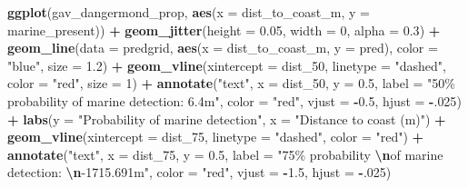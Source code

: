 \documentclass[
]{article}
\newenvironment{Shaded}{\begin{snugshade}}{\end{snugshade}}
\newcommand{\AttributeTok}[1]{\textcolor[rgb]{0.13,0.29,0.53}{#1}}
\newcommand{\DecValTok}[1]{\textcolor[rgb]{0.00,0.00,0.81}{#1}}
\newcommand{\FloatTok}[1]{\textcolor[rgb]{0.00,0.00,0.81}{#1}}
\newcommand{\FunctionTok}[1]{\textcolor[rgb]{0.13,0.29,0.53}{\textbf{#1}}}
\newcommand{\NormalTok}[1]{#1}
\newcommand{\SpecialCharTok}[1]{\textcolor[rgb]{0.81,0.36,0.00}{\textbf{#1}}}
\newcommand{\StringTok}[1]{\textcolor[rgb]{0.31,0.60,0.02}{#1}}
\begin{document}
\begin{Shaded}
\begin{Highlighting}[]
\FunctionTok{ggplot}\NormalTok{(gav\_dangermond\_prop, }\FunctionTok{aes}\NormalTok{(}\AttributeTok{x =}\NormalTok{ dist\_to\_coast\_m, }\AttributeTok{y =}\NormalTok{ marine\_present)) }\SpecialCharTok{+}
  \FunctionTok{geom\_jitter}\NormalTok{(}\AttributeTok{height =} \FloatTok{0.05}\NormalTok{, }\AttributeTok{width =} \DecValTok{0}\NormalTok{, }\AttributeTok{alpha =} \FloatTok{0.3}\NormalTok{) }\SpecialCharTok{+}
  \FunctionTok{geom\_line}\NormalTok{(}\AttributeTok{data =}\NormalTok{ predgrid, }\FunctionTok{aes}\NormalTok{(}\AttributeTok{x =}\NormalTok{ dist\_to\_coast\_m, }\AttributeTok{y =}\NormalTok{ pred),}
            \AttributeTok{color =} \StringTok{"blue"}\NormalTok{, }\AttributeTok{size =} \FloatTok{1.2}\NormalTok{) }\SpecialCharTok{+}
  \FunctionTok{geom\_vline}\NormalTok{(}\AttributeTok{xintercept =}\NormalTok{ dist\_50, }\AttributeTok{linetype =} \StringTok{"dashed"}\NormalTok{, }\AttributeTok{color =} \StringTok{"red"}\NormalTok{, }\AttributeTok{size =} \DecValTok{1}\NormalTok{) }\SpecialCharTok{+}
  \FunctionTok{annotate}\NormalTok{(}\StringTok{"text"}\NormalTok{, }\AttributeTok{x =}\NormalTok{ dist\_50, }\AttributeTok{y =} \FloatTok{0.5}\NormalTok{, }\AttributeTok{label =} \StringTok{"50\% probability of marine detection: 6.4m"}\NormalTok{, }\AttributeTok{color =} \StringTok{"red"}\NormalTok{, }\AttributeTok{vjust =} \SpecialCharTok{{-}}\FloatTok{0.5}\NormalTok{, }\AttributeTok{hjust =} \SpecialCharTok{{-}}\NormalTok{.}\DecValTok{025}\NormalTok{) }\SpecialCharTok{+}
  \FunctionTok{labs}\NormalTok{(}\AttributeTok{y =} \StringTok{"Probability of marine detection"}\NormalTok{,}
       \AttributeTok{x =} \StringTok{"Distance to coast (m)"}\NormalTok{) }\SpecialCharTok{+}
  \FunctionTok{geom\_vline}\NormalTok{(}\AttributeTok{xintercept =}\NormalTok{ dist\_75, }\AttributeTok{linetype =} \StringTok{"dashed"}\NormalTok{, }\AttributeTok{color =} \StringTok{"red"}\NormalTok{) }\SpecialCharTok{+}
  \FunctionTok{annotate}\NormalTok{(}\StringTok{"text"}\NormalTok{, }\AttributeTok{x =}\NormalTok{ dist\_75, }\AttributeTok{y =} \FloatTok{0.5}\NormalTok{, }\AttributeTok{label =} \StringTok{"75\% probability }\SpecialCharTok{\textbackslash{}n}\StringTok{of marine detection: }\SpecialCharTok{\textbackslash{}n}\StringTok{{-}1715.691m"}\NormalTok{, }\AttributeTok{color =} \StringTok{"red"}\NormalTok{, }\AttributeTok{vjust =} \SpecialCharTok{{-}}\FloatTok{1.5}\NormalTok{, }\AttributeTok{hjust =} \SpecialCharTok{{-}}\NormalTok{.}\DecValTok{025}\NormalTok{)}
\end{Highlighting}
\end{Shaded}
\end{document}

